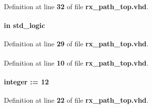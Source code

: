 Definition at line {\bf 32} of file {\bf rx\+\_\+path\+\_\+top.\+vhd}.

\paragraph[{mode}]{ {\bfseries \textcolor{keywordflow}{in}\textcolor{vhdlchar}{ }} {\bfseries \textcolor{comment}{std\+\_\+logic}\textcolor{vhdlchar}{ }} \hspace{0.3cm}{\ttfamily [Port]}}\label{classrx__path__top_a219fe733f94bce997e904a6e45b1ac19}


Definition at line {\bf 29} of file {\bf rx\+\_\+path\+\_\+top.\+vhd}.

\paragraph[{numeric\+\_\+std}]{\hspace{0.3cm}{\ttfamily [Package]}}\label{classrx__path__top_a2edc34402b573437d5f25fa90ba4013e}


Definition at line {\bf 10} of file {\bf rx\+\_\+path\+\_\+top.\+vhd}.

\paragraph[{pct\+\_\+buff\+\_\+wrusedw\+\_\+w}]{ {\bfseries \textcolor{vhdlchar}{ }} {\bfseries \textcolor{comment}{integer}\textcolor{vhdlchar}{ }\textcolor{vhdlchar}{ }\textcolor{vhdlchar}{\+:}\textcolor{vhdlchar}{=}\textcolor{vhdlchar}{ }\textcolor{vhdlchar}{ } \textcolor{vhdldigit}{12} \textcolor{vhdlchar}{ }} \hspace{0.3cm}{\ttfamily [Generic]}}\label{classrx__path__top_a6874fe211fb9d5278a1fc7e62a2c0e12}


Definition at line {\bf 22} of file {\bf rx\+\_\+path\+\_\+top.\+vhd}.

